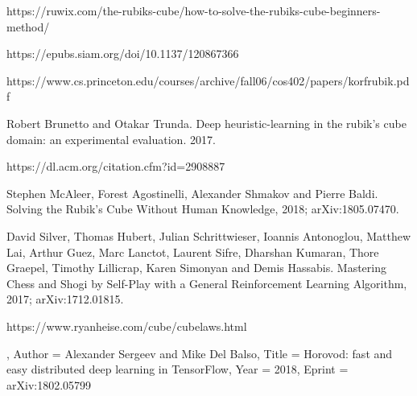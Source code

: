 \documentclass[10pt,twocolumn,letterpaper]{article}
\begin{document}
\begin{thebibliography}{9}

\bibitem{}
https://ruwix.com/the-rubiks-cube/how-to-solve-the-rubiks-cube-beginners-method/

\bibitem{}
https://epubs.siam.org/doi/10.1137/120867366

\bibitem{}
https://www.cs.princeton.edu/courses/archive/fall06/cos402/papers/korfrubik.pdf

\bibitem{}
Robert Brunetto and Otakar Trunda. Deep heuristic-learning in the rubik’s cube domain: an experimental evaluation. 2017.

\bibitem{}
https://dl.acm.org/citation.cfm?id=2908887

Stephen McAleer, Forest Agostinelli, Alexander Shmakov and Pierre Baldi.
\newblock Solving the Rubik's Cube Without Human Knowledge, 2018;
\newblock arXiv:1805.07470.

David Silver, Thomas Hubert, Julian Schrittwieser, Ioannis Antonoglou, Matthew Lai, Arthur Guez, Marc Lanctot, Laurent Sifre, Dharshan Kumaran, Thore Graepel, Timothy Lillicrap, Karen Simonyan and Demis Hassabis.
\newblock Mastering Chess and Shogi by Self-Play with a General Reinforcement Learning Algorithm, 2017;
\newblock arXiv:1712.01815.

\bibitem{}
https://www.ryanheise.com/cube/cube\textunderscore laws.html

,
Author = {Alexander Sergeev and Mike Del Balso},
Title = {Horovod: fast and easy distributed deep learning in TensorFlow},
Year = {2018},
Eprint = {arXiv:1802.05799}

\end{thebibliography}

{\small


}
\end{document}
